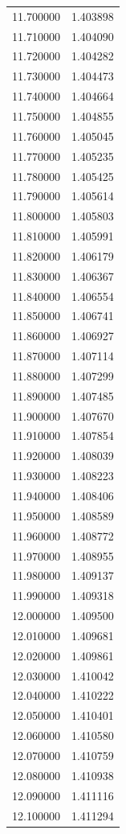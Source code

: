 \begin{tabular}{rr}
11.700000 & 1.403898 \\
11.710000 & 1.404090 \\
11.720000 & 1.404282 \\
11.730000 & 1.404473 \\
11.740000 & 1.404664 \\
11.750000 & 1.404855 \\
11.760000 & 1.405045 \\
11.770000 & 1.405235 \\
11.780000 & 1.405425 \\
11.790000 & 1.405614 \\
11.800000 & 1.405803 \\
11.810000 & 1.405991 \\
11.820000 & 1.406179 \\
11.830000 & 1.406367 \\
11.840000 & 1.406554 \\
11.850000 & 1.406741 \\
11.860000 & 1.406927 \\
11.870000 & 1.407114 \\
11.880000 & 1.407299 \\
11.890000 & 1.407485 \\
11.900000 & 1.407670 \\
11.910000 & 1.407854 \\
11.920000 & 1.408039 \\
11.930000 & 1.408223 \\
11.940000 & 1.408406 \\
11.950000 & 1.408589 \\
11.960000 & 1.408772 \\
11.970000 & 1.408955 \\
11.980000 & 1.409137 \\
11.990000 & 1.409318 \\
12.000000 & 1.409500 \\
12.010000 & 1.409681 \\
12.020000 & 1.409861 \\
12.030000 & 1.410042 \\
12.040000 & 1.410222 \\
12.050000 & 1.410401 \\
12.060000 & 1.410580 \\
12.070000 & 1.410759 \\
12.080000 & 1.410938 \\
12.090000 & 1.411116 \\
12.100000 & 1.411294 \\

\end{tabular}
